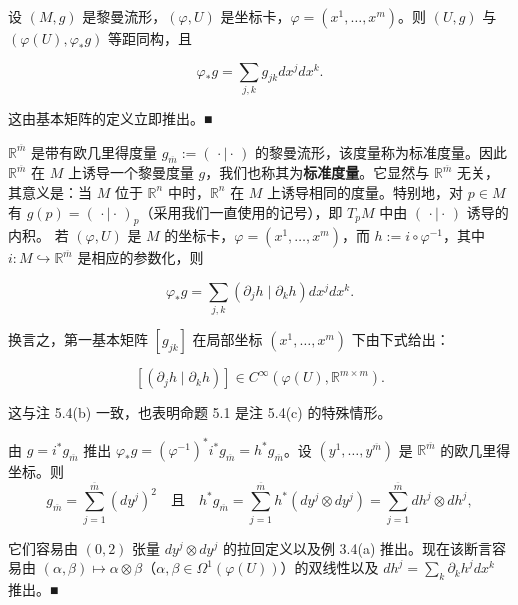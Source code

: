 \begin{example}

\textbf{
}

\begin{items}
\item

设 $ (M, g) $ 是黎曼流形，$ (\varphi, U) $ 是坐标卡，$ \varphi = (x^{1}, \ldots, x^{m}) $。则 $ (U, g) $ 与 $ (\varphi(U), \varphi_{*}g) $ 等距同构，且

\[
\varphi_{*}g = \sum_{j,k} g_{jk} dx^{j} dx^{k} .
\]

\proofhead
这由基本矩阵的定义立即推出。\nobreak\hspace{0.35em}■
\item

$ \mathbb{R}^{\overline{m}} $ 是带有欧几里得度量 $ g_{\overline{m}} := (\,\cdot \mid \cdot\,) $ 的黎曼流形，该度量称为标准度量。因此 $ \mathbb{R}^{\overline{m}} $ 在 $ M $ 上诱导一个黎曼度量 $ g $，我们也称其为\textbf{标准度量}。它显然与 $ \mathbb{R}^{\overline{m}} $ 无关，其意义是：当 $ M $ 位于 $ \mathbb{R}^{n} $ 中时，$ \mathbb{R}^{n} $ 在 $ M $ 上诱导相同的度量。特别地，对 $ p \in M $ 有 $ g(p) = (\,\cdot \mid \cdot\,)_{p} $（采用我们一直使用的记号），即 $ T_{p}M $ 中由 $ (\,\cdot \mid \cdot\,) $ 诱导的内积。
若 $ (\varphi, U) $ 是 $ M $ 的坐标卡，$ \varphi = (x^{1}, \ldots, x^{m}) $，而 $ h := i \circ \varphi^{-1} $，其中 $ i: M \hookrightarrow \mathbb{R}^{\overline{m}} $ 是相应的参数化，则

\[
\varphi_{*}g = \sum_{j,k} (\partial_{j}h \mid \partial_{k}h) dx^{j} dx^{k} .
\]

换言之，第一基本矩阵 $ [g_{jk}] $ 在局部坐标 $ (x^{1}, \ldots, x^{m}) $ 下由下式给出：

\[
[(\partial_{j}h \mid \partial_{k}h)] \in C^{\infty}(\varphi(U), \mathbb{R}^{m \times m}) .
\]

这与注 5.4(b) 一致，也表明命题 5.1 是注 5.4(c) 的特殊情形。

\proofhead
由 $ g = i^{*}g_{\overline{m}} $ 推出 $ \varphi_{*}g = (\varphi^{-1})^{*}i^{*}g_{\overline{m}} = h^{*}g_{\overline{m}} $。设 $ (y^{1}, \ldots, y^{\overline{m}}) $ 是 $ \mathbb{R}^{\overline{m}} $ 的欧几里得坐标。则
\[
g_{\overline{m}} = \sum_{j=1}^{\overline{m}} (dy^{j})^{2} \quad \text{且} \quad h^{*}g_{\overline{m}} = \sum_{j=1}^{\overline{m}} h^{*}(dy^{j} \otimes dy^{j}) = \sum_{j=1}^{\overline{m}} dh^{j} \otimes dh^{j} ,
\]

它们容易由 $ (0, 2) $ 张量 $ dy^{j} \otimes dy^{j} $ 的拉回定义以及例 3.4(a) 推出。现在该断言容易由 $ (\alpha, \beta) \mapsto \alpha \otimes \beta $（$ \alpha, \beta \in \Omega^{1}(\varphi(U)) $）的双线性以及 $ dh^{j} = \sum_{k} \partial_{k}h^{j} dx^{k} $ 推出。\nobreak\hspace{0.35em}■


\end{items}
\end{example}
